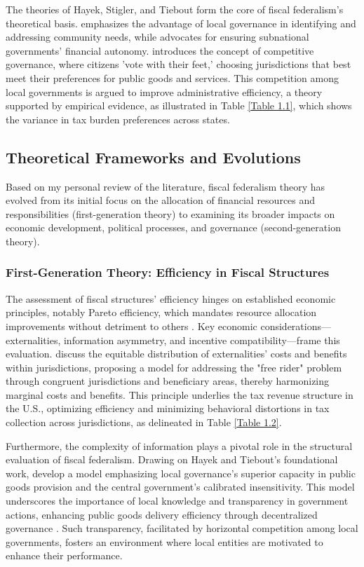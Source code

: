 The theories of Hayek, Stigler, and Tiebout form the core of fiscal federalism's theoretical basis. \textcite{hayek2009use} emphasizes the advantage of local governance in identifying and addressing community needs, while \textcite{stigler1998tenable} advocates for ensuring subnational governments' financial autonomy. \textcite{tiebout1956pure} introduces the concept of competitive governance, where citizens 'vote with their feet,' choosing jurisdictions that best meet their preferences for public goods and services. This competition among local governments is argued to improve administrative efficiency, a theory supported by empirical evidence, as illustrated in Table \ref*{Table 1.1}, which shows the variance in tax burden preferences across states.

\subsection{Theoretical Frameworks and Evolutions}
Based on my personal review of the literature, fiscal federalism theory has evolved from its initial focus on the allocation of financial resources and responsibilities (first-generation theory) to examining its broader impacts on economic development, political processes, and governance (second-generation theory).

\subsubsection{First-Generation Theory: Efficiency in Fiscal Structures}

The assessment of fiscal structures' efficiency hinges on established economic principles, notably Pareto efficiency, which mandates resource allocation improvements without detriment to others \parencite{pareto2014manual}. Key economic considerations—externalities, information asymmetry, and incentive compatibility—frame this evaluation. \textcite{oates1972fiscal} discuss the equitable distribution of externalities' costs and benefits within jurisdictions, proposing a model for addressing the "free rider" problem through congruent jurisdictions and beneficiary areas, thereby harmonizing marginal costs and benefits. This principle underlies the tax revenue structure in the U.S., optimizing efficiency and minimizing behavioral distortions in tax collection across jurisdictions, as delineated in Table \ref*{Table 1.2}.

Furthermore, the complexity of information plays a pivotal role in the structural evaluation of fiscal federalism. Drawing on Hayek and Tiebout's foundational work, \textcite{2003Centralized} develop a model emphasizing local governance's superior capacity in public goods provision and the central government's calibrated insensitivity. This model underscores the importance of local knowledge and transparency in government actions, enhancing public goods delivery efficiency through decentralized governance \parencite{martinez2003fiscal,baicker2005spillover}. Such transparency, facilitated by horizontal competition among local governments, fosters an environment where local entities are motivated to enhance their performance.


